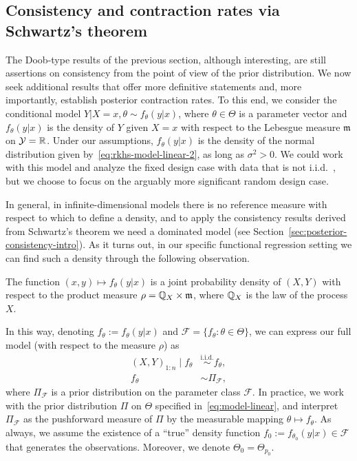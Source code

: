 \subsection{Consistency and contraction rates via Schwartz's theorem}

The Doob-type results of the previous section, although interesting, are still assertions on consistency from the point of view of the prior distribution. We now seek additional results that offer more definitive statements and, more importantly, establish posterior contraction rates. To this end, we consider the conditional model \(Y|X=x, \theta \sim f_\theta(y|x)\), where \(\theta\in\Theta\) is a parameter vector and \(f_\theta(y|x)\) is the density of \(Y\) given \(X=x\) with respect to the Lebesgue measure \(\mathfrak{m}\) on \(\mathcal Y=\mathbb{R}\). Under our assumptions, \(f_\theta(y|x)\) is the density of the normal distribution given by~\eqref{eq:rkhs-model-linear-2}, as long as \(\sigma^2>0\). We could work with this model and analyze the fixed design case with data that is not i.i.d.\ \citep[see][]{choi2008remarks}, but we choose to focus on the arguably more significant random design case.

In general, in infinite-dimensional models there is no reference measure with respect to which to define a density, and to apply the consistency results derived from Schwartz's theorem we need a dominated model (see Section~\ref{sec:posterior-consistency-intro}). As it turns out, in our specific functional regression setting we can find such a density through the following observation. 

\begin{lemma}
  \label{lemma:joint-density-rho} %
  The function \((x,y)\mapsto f_\theta(y|x)\) is a joint probability density of \((X,Y)\) with respect to the product measure \(\rho=\mathbb{Q}_X\times \mathfrak{m}\), where \(\mathbb{Q}_X\) is the law of the process \(X\).
\end{lemma}

In this way, denoting \(f_\theta := f_\theta(y|x)\) and \(\mathcal F=\{f_\theta: \theta \in \Theta\}\), we can express our full model (with respect to the measure \(\rho\)) as
\begin{align*}
  (X, Y)_{1:n} \mid f_\theta &\stackrel{\text{i.i.d.}}{\sim} f_\theta,\\
  f_\theta &\sim \Pi_{\mathcal F},
\end{align*}
where \(\Pi_{\mathcal F}\) is a prior distribution on the parameter class \(\mathcal F\). In practice, we work with the prior distribution \(\Pi\) on \(\Theta\) specified in~\eqref{eq:model-linear}, and interpret \(\Pi_{\mathcal F}\) as the pushforward measure of \(\Pi\) by the measurable mapping \(\theta \mapsto f_\theta\). As always, we assume the existence of a ``true'' density function \(f_0 :=f_{\theta_0}(y|x)\in \mathcal F\) that generates the observations. Moreover, we denote \(\Theta_0=\Theta_{p_0}\).

